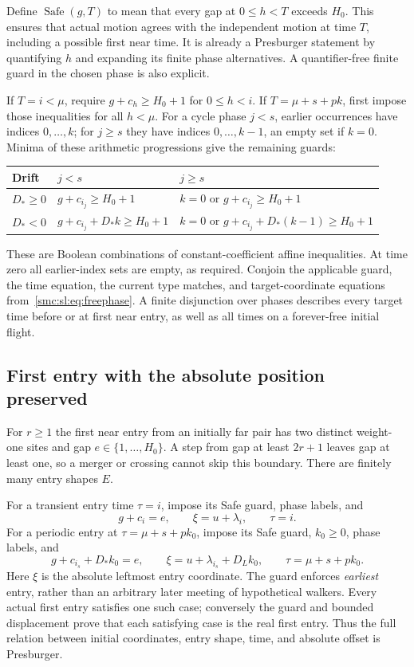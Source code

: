 \documentclass[11pt,letterpaper]{article}
\numberwithin{equation}{section}
\theoremstyle{definition}
\theoremstyle{remark}
\begin{document}
Define $\operatorname{Safe}(g,T)$ to mean that every gap at $0\le h<T$ exceeds $H_0$. This ensures that actual motion agrees with the independent motion at time $T$, including a possible first near time. It is already a Presburger statement by quantifying $h$ and expanding its finite phase alternatives. A quantifier-free finite guard in the chosen phase is also explicit.

If $T=i<\mu$, require $g+c_h\ge H_0+1$ for $0\le h<i$. If $T=\mu+s+pk$, first impose those inequalities for all $h<\mu$. For a cycle phase $j<s$, earlier occurrences have indices $0,\ldots,k$; for $j\ge s$ they have indices $0,\ldots,k-1$, an empty set if $k=0$. Minima of these arithmetic progressions give the remaining guards:
\begin{center}
\begin{tabular}{@{}lll@{}}
\toprule
Drift & $j<s$ & $j\ge s$\\\midrule
$D_*\ge0$ & $g+c_{i_j}\ge H_0+1$ & $k=0$ or $g+c_{i_j}\ge H_0+1$\\
$D_*<0$ & $g+c_{i_j}+D_*k\ge H_0+1$ & $k=0$ or $g+c_{i_j}+D_*(k-1)\ge H_0+1$\\\bottomrule
\end{tabular}
\end{center}
These are Boolean combinations of constant-coefficient affine inequalities. At time zero all earlier-index sets are empty, as required. Conjoin the applicable guard, the time equation, the current type matches, and target-coordinate equations from~\eqref{smc:sl:eq:freephase}. A finite disjunction over phases describes every target time before or at first near entry, as well as all times on a forever-free initial flight.

\subsection{First entry with the absolute position preserved}
For $r\ge1$ the first near entry from an initially far pair has two distinct weight-one sites and gap $e\in\{1,\ldots,H_0\}$. A step from gap at least $2r+1$ leaves gap at least one, so a merger or crossing cannot skip this boundary. There are finitely many entry shapes $E$.

For a transient entry time $\tau=i$, impose its Safe guard, phase labels, and
\[
 g+c_i=e,\qquad \xi=u+\lambda_i,\qquad \tau=i.
\]
For a periodic entry at $\tau=\mu+s+pk_0$, impose its Safe guard, $k_0\ge0$, phase labels, and
\begin{equation}\label{smc:sl:eq:firstentry}
 g+c_{i_s}+D_*k_0=e,\qquad
 \xi=u+\lambda_{i_s}+D_Lk_0,\qquad
 \tau=\mu+s+pk_0.
\end{equation}
Here $\xi$ is the absolute leftmost entry coordinate. The guard enforces \emph{earliest} entry, rather than an arbitrary later meeting of hypothetical walkers. Every actual first entry satisfies one such case; conversely the guard and bounded displacement prove that each satisfying case is the real first entry. Thus the full relation between initial coordinates, entry shape, time, and absolute offset is Presburger.
\end{document}
